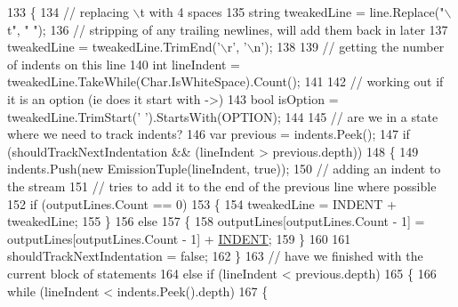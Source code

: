 \begin{DoxyCode}
133                 \{
134                     \textcolor{comment}{// replacing \(\backslash\)t with 4 spaces}
135                     \textcolor{keywordtype}{string} tweakedLine = line.Replace(\textcolor{stringliteral}{"\(\backslash\)t"}, \textcolor{stringliteral}{"    "});
136                     \textcolor{comment}{// stripping of any trailing newlines, will add them back in later}
137                     tweakedLine = tweakedLine.TrimEnd(\textcolor{charliteral}{'\(\backslash\)r'}, \textcolor{charliteral}{'\(\backslash\)n'});
138 
139                     \textcolor{comment}{// getting the number of indents on this line}
140                     \textcolor{keywordtype}{int} lineIndent = tweakedLine.TakeWhile(Char.IsWhiteSpace).Count();
141 
142                     \textcolor{comment}{// working out if it is an option (ie does it start with ->)}
143                     \textcolor{keywordtype}{bool} isOption = tweakedLine.TrimStart(\textcolor{charliteral}{' '}).StartsWith(OPTION);
144 
145                     \textcolor{comment}{// are we in a state where we need to track indents?}
146                     var previous = indents.Peek();
147                     \textcolor{keywordflow}{if} (shouldTrackNextIndentation && (lineIndent > previous.depth))
148                     \{
149                         indents.Push(\textcolor{keyword}{new} EmissionTuple(lineIndent, \textcolor{keyword}{true}));
150                         \textcolor{comment}{// adding an indent to the stream}
151                         \textcolor{comment}{// tries to add it to the end of the previous line where possible}
152                         \textcolor{keywordflow}{if} (outputLines.Count == 0)
153                         \{
154                             tweakedLine = INDENT + tweakedLine;
155                         \}
156                         \textcolor{keywordflow}{else}
157                         \{
158                             outputLines[outputLines.Count - 1] = outputLines[outputLines.Count - 1] + 
      \hyperlink{a00336_ae3f2190a793ab77428838e58e0e83676}{INDENT};
159                         \}
160 
161                         shouldTrackNextIndentation = \textcolor{keyword}{false};
162                     \}
163                     \textcolor{comment}{// have we finished with the current block of statements}
164                     \textcolor{keywordflow}{else} \textcolor{keywordflow}{if} (lineIndent < previous.depth)
165                     \{
166                         \textcolor{keywordflow}{while} (lineIndent < indents.Peek().depth)
167                         \{

\end{DoxyCode}
